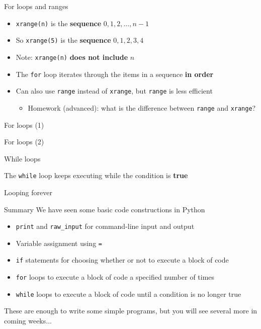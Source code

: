 \begin{frame}{For loops and ranges}
	
	\begin{itemize}
		\pause\item \lstinline{xrange(n)} is the \textbf{sequence}
			$0, 1, 2, \dots, n-1$
		\pause\item So \lstinline{xrange(5)} is the \textbf{sequence}
			$0, 1, 2, 3, 4$
		\pause\item Note: \lstinline{xrange(n)} \textbf{does not include} $n$
		\pause\item The \lstinline{for} loop iterates through the items in a sequence \textbf{in order}
		\pause\item Can also use \lstinline{range} instead of \lstinline{xrange},
			but \lstinline{range} is less efficient
			\begin{itemize}
				\item Homework (advanced): what is the difference between \lstinline{range} and \lstinline{xrange}?
			\end{itemize}
	\end{itemize}
\end{frame}

\begin{frame}{For loops (1)}
	\socrative
\end{frame}

\begin{frame}{For loops (2)}
	\socrative
\end{frame}

\begin{frame}{While loops}
	\socrative
	
	The \lstinline{while} loop keeps executing while the condition is \textbf{true}
	
\end{frame}

\begin{frame}{Looping forever}
	
\end{frame}

\begin{frame}{Summary}
	\pause We have seen some basic code constructions in Python
	\begin{itemize}
		\pause\item \lstinline{print} and \lstinline{raw_input} for command-line input and output
		\pause\item Variable assignment using \lstinline{=}
		\pause\item \lstinline{if} statements for choosing whether or not to execute a block of code
		\pause\item \lstinline{for} loops to execute a block of code a specified number of times
		\pause\item \lstinline{while} loops to execute a block of code until a condition is no longer true
	\end{itemize}
	\pause These are enough to write some simple programs, but you will see several more in coming weeks...
\end{frame}

